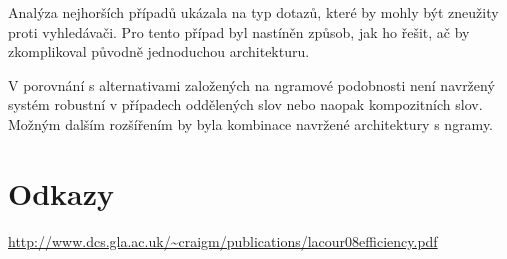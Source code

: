 \documentclass[11pt,letterpaper,oneside,openright]{book}
\begin{document}
Analýza nejhorších případů ukázala na typ dotazů, které by mohly být zneužity
proti vyhledávači. Pro tento případ byl nastíněn způsob, jak ho řešit, ač by
zkomplikoval původně jednoduchou architekturu.

V porovnání s alternativami založených na ngramové podobnosti není navržený
systém robustní v případech oddělených slov nebo naopak kompozitních slov.
Možným dalším rozšířením by byla kombinace navržené architektury s ngramy.

\section*{Odkazy}
\url{http://www.dcs.gla.ac.uk/~craigm/publications/lacour08efficiency.pdf}


\renewcommand{\refname}{Reference}
\renewcommand{\bibname}{Reference}
\setlength{\bibsep}{0pt}

\end{document}
